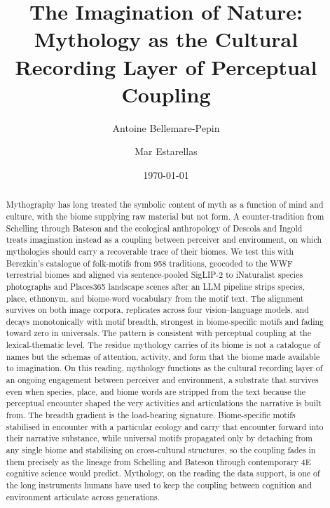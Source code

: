 \documentclass[11pt,a4paper]{article}
\title{\bfseries The Imagination of Nature:\\
\large Mythology as the Cultural Recording Layer of Perceptual Coupling}
\author[1]{Antoine Bellemare-Pepin}
\author[2]{Mar Estarellas}
\affil[1]{Department of Psychology, Université de Montréal}
\affil[2]{Department of Psychiatry, McGill University}
\date{\today}
\begin{document}
\maketitle

\begin{abstract}\noindent
Mythography has long treated the symbolic content of myth as a
function of mind and culture, with the biome supplying raw
material but not form. A counter-tradition from Schelling through
Bateson and the ecological anthropology of Descola and Ingold
treats imagination instead as a coupling between perceiver and
environment, on which mythologies should carry a recoverable
trace of their biomes. We test this with Berezkin's catalogue of
folk-motifs from 958 traditions, geocoded to the WWF terrestrial
biomes and aligned via sentence-pooled SigLIP-2 to iNaturalist
species photographs and Places365 landscape scenes after an LLM
pipeline strips species, place, ethnonym, and biome-word
vocabulary from the motif text. The alignment survives on both
image corpora, replicates across four vision--language models,
and decays monotonically with motif breadth, strongest in
biome-specific motifs and fading toward zero in universals. The
pattern is consistent with perceptual coupling at the
lexical-thematic level. The residue mythology carries of its
biome is not a catalogue of names but the schemas of attention,
activity, and form that the biome made available to imagination.
On this reading, mythology functions as the cultural recording
layer of an ongoing engagement between perceiver and environment,
a substrate that survives even when species, place, and biome
words are stripped from the text because the perceptual encounter
shaped the very activities and articulations the narrative is
built from. The breadth gradient is the load-bearing signature.
Biome-specific motifs stabilised in encounter with a particular
ecology and carry that encounter forward into their narrative
substance, while universal motifs propagated only by detaching
from any single biome and stabilising on cross-cultural
structures, so the coupling fades in them precisely as the
lineage from Schelling and Bateson through contemporary 4E
cognitive science would predict. Mythology, on the reading the
data support, is one of the long instruments humans have used to
keep the coupling between cognition and environment articulate
across generations.
\end{abstract}

\vspace{0.6em}
\end{document}
